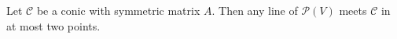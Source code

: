 Let $\mathcal{C}$ be a conic with symmetric matrix $A$. Then any line of $\mathcal{P}(V)$ meets $\mathcal{C}$ in at most two points.
